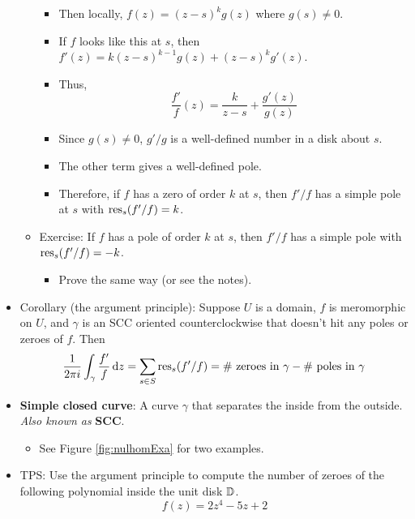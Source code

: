 \documentclass[../notes.tex]{subfiles}
\begin{document}
\begin{itemize}
\begin{itemize}
\begin{itemize}
            \item Then locally, $f(z)=(z-s)^kg(z)$ where $g(s)\neq 0$.
            \item If $f$ looks like this at $s$, then $f'(z)=k(z-s)^{k-1}g(z)+(z-s)^kg'(z)$.
            \item Thus,
            \begin{equation*}
                \frac{f'}{f}(z) = \frac{k}{z-s}+\frac{g'(z)}{g(z)}
            \end{equation*}
            \item Since $g(s)\neq 0$, $g'/g$ is a well-defined number in a disk about $s$.
            \item The other term gives a well-defined pole.
            \item Therefore, if $f$ has a zero of order $k$ at $s$, then $f'/f$ has a simple pole at $s$ with $\operatorname{res}_s(f'/f)=k$.
        \end{itemize}
        \item Exercise: If $f$ has a pole of order $k$ at $s$, then $f'/f$ has a simple pole with $\operatorname{res}_s(f'/f)=-k$.
        \begin{itemize}
            \item Prove the same way (or see the notes).
        \end{itemize}
    \end{itemize}
    \item Corollary (the argument principle): Suppose $U$ is a domain, $f$ is meromorphic on $U$, and $\gamma$ is an SCC oriented counterclockwise that doesn't hit any poles or zeroes of $f$. Then
    \begin{equation*}
        \frac{1}{2\pi i}\int_\gamma\frac{f'}{f}\dd{z} = \sum_{s\in S}\operatorname{res}_s(f'/f)
        = \#\text{ zeroes in }\gamma-\#\text{ poles in }\gamma
    \end{equation*}
    \item \textbf{Simple closed curve}: A curve $\gamma$ that separates the inside from the outside. \emph{Also known as} \textbf{SCC}.
    \begin{itemize}
        \item See Figure \ref{fig:nulhomExa} for two examples.
    \end{itemize}
    \item TPS: Use the argument principle to compute the number of zeroes of the following polynomial inside the unit disk $\mathbb{D}$.
    \begin{equation*}
        f(z) = 2z^4-5z+2
    \end{equation*}

\end{itemize}
\end{document}
